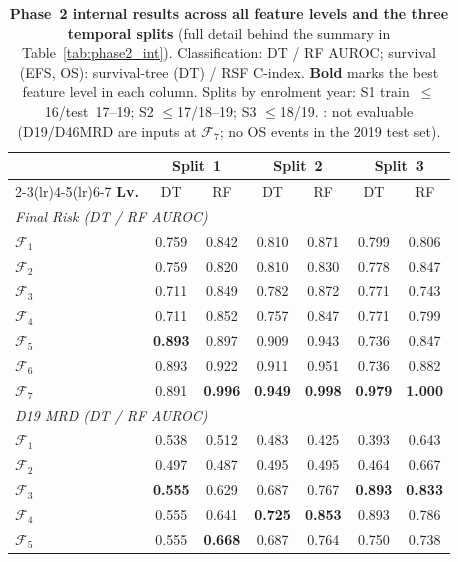 \documentclass[pdflatex,sn-nature]{sn-jnl}
\begin{document}
\begin{table}[p]
\caption{\textbf{Phase~2 internal results across all feature levels and
the three temporal splits} (full detail behind the summary in
Table~\ref{tab:phase2_int}). Classification: DT / RF AUROC; survival
(EFS, OS): survival-tree (DT) / RSF C-index. \textbf{Bold} marks
the best feature level in each column. Splits by enrolment year: S1
train~$\leq$16/test~17--19; S2 $\leq$17/18--19; S3 $\leq$18/19.
\textemdash{}: not evaluable (D19/D46MRD are inputs at $\mathcal{F}_7$;
no OS events in the 2019 test set).}
\label{tab:phase2_int_full}
\centering
\footnotesize
\renewcommand{\arraystretch}{0.88}
\setlength{\tabcolsep}{5pt}
\begin{tabular}{@{}l cc cc cc@{}}
\toprule
 & \multicolumn{2}{c}{\textbf{Split~1}} & \multicolumn{2}{c}{\textbf{Split~2}} & \multicolumn{2}{c}{\textbf{Split~3}} \\
\cmidrule(lr){2-3}\cmidrule(lr){4-5}\cmidrule(lr){6-7}
\textbf{Lv.} & DT & RF & DT & RF & DT & RF \\
\midrule
\multicolumn{7}{l}{\textit{Final Risk (DT / RF AUROC)}} \\
$\mathcal{F}_1$ & 0.759 & 0.842 & 0.810 & 0.871 & 0.799 & 0.806 \\
$\mathcal{F}_2$ & 0.759 & 0.820 & 0.810 & 0.830 & 0.778 & 0.847 \\
$\mathcal{F}_3$ & 0.711 & 0.849 & 0.782 & 0.872 & 0.771 & 0.743 \\
$\mathcal{F}_4$ & 0.711 & 0.852 & 0.757 & 0.847 & 0.771 & 0.799 \\
$\mathcal{F}_5$ & \textbf{0.893} & 0.897 & 0.909 & 0.943 & 0.736 & 0.847 \\
$\mathcal{F}_6$ & 0.893 & 0.922 & 0.911 & 0.951 & 0.736 & 0.882 \\
$\mathcal{F}_7$ & 0.891 & \textbf{0.996} & \textbf{0.949} & \textbf{0.998} & \textbf{0.979} & \textbf{1.000} \\
\multicolumn{7}{l}{\textit{D19 MRD (DT / RF AUROC)}} \\
$\mathcal{F}_1$ & 0.538 & 0.512 & 0.483 & 0.425 & 0.393 & 0.643 \\
$\mathcal{F}_2$ & 0.497 & 0.487 & 0.495 & 0.495 & 0.464 & 0.667 \\
$\mathcal{F}_3$ & \textbf{0.555} & 0.629 & 0.687 & 0.767 & \textbf{0.893} & \textbf{0.833} \\
$\mathcal{F}_4$ & 0.555 & 0.641 & \textbf{0.725} & \textbf{0.853} & 0.893 & 0.786 \\
$\mathcal{F}_5$ & 0.555 & \textbf{0.668} & 0.687 & 0.764 & 0.750 & 0.738 \\

\end{tabular}
\end{table}
\end{document}
